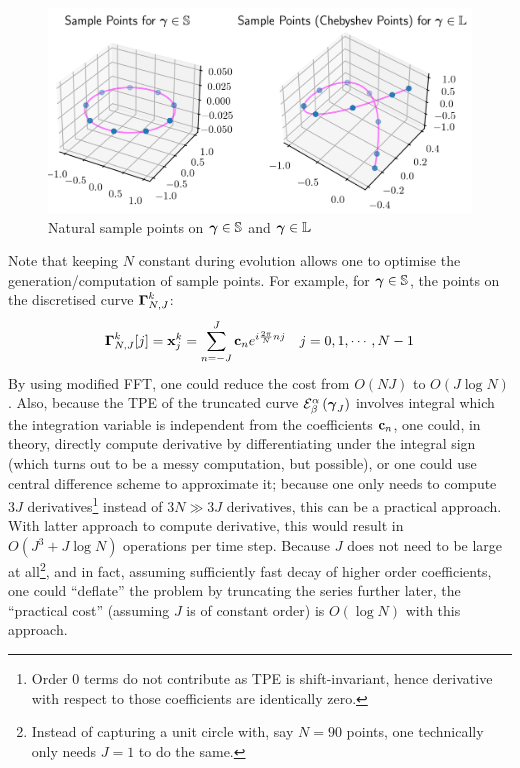 \documentclass[../dissertation.tex]{subfiles}
\begin{document}
\begin{figure}[tbp]
    \centering
    \includegraphics[width=\textwidth]{sections/FourierSeriesImgs/SamplePointsOnCurves}
    \caption{Natural sample points on $\boldsymbol{\gamma} \in \mathbb{S}$ and $\boldsymbol{\gamma} \in \mathbb{L}$}
\end{figure}

Note that keeping $N$ constant during evolution allows one to optimise the generation/computation of sample points.
For example, for $\boldsymbol{\gamma} \in \mathbb{S}$, the points on the discretised curve $\boldsymbol{\Gamma}_{N,J}^k$:
\begin{align}
    \boldsymbol{\Gamma}_{N,J}^k [j] &= \mathbf{x}_{j}^{k} = \sum_{n=-J}^{J} \mathbf{c}_{n} e^{i \frac{2\pi}{N}n j} & j=0,1,\cdots,N-1
    \label{equ: DFT}
\end{align}
By using modified FFT\cite{5213896}, one could reduce the cost from $O\left( NJ \right)$ to $O \left( J \log N \right)$.
Also, because the TPE of the truncated curve $\mathcal{E}_{\beta}^{\alpha} \left( \boldsymbol{\gamma}_{J} \right)$ involves integral which the integration variable is independent from the coefficients $\mathbf{c}_n$,
one could, in theory, directly compute derivative by differentiating under the integral sign (which turns out to be a messy computation, but possible),
or one could use central difference scheme to approximate it;
because one only needs to compute $3J$ derivatives\footnote{Order $0$ terms do not contribute as TPE is shift-invariant, hence derivative with respect to those coefficients are identically zero.}
instead of $3N \gg 3J$ derivatives, this can be a practical approach.
With latter approach to compute derivative, this would result in $O\left( J^3 + J \log N \right)$ operations per time step.
Because $J$ does not need to be large at all\footnote{Instead of capturing a unit circle with, say $N = 90$ points, one technically only needs $J=1$ to do the same.},
and in fact, assuming sufficiently fast decay of higher order coefficients,
one could ``deflate'' the problem by truncating the series further later,
the ``practical cost'' (assuming $J$ is of constant order) is $O\left( \log N \right)$ with this approach.
\end{document}
